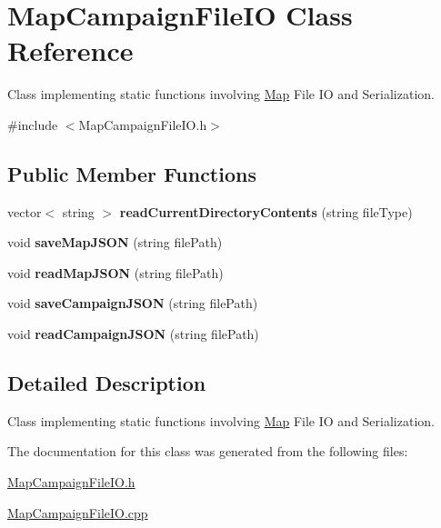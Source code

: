 \hypertarget{classMapCampaignFileIO}{}\section{Map\+Campaign\+File\+IO Class Reference}
\label{classMapCampaignFileIO}


Class implementing static functions involving \hyperlink{classMap}{Map} File IO and Serialization.  




{\ttfamily \#include $<$Map\+Campaign\+File\+I\+O.\+h$>$}

\subsection*{Public Member Functions}
\begin{DoxyCompactItemize}
\item 
\hypertarget{classMapCampaignFileIO_a9e2f40e478902cc4d3a8255d76fda173}{}\label{classMapCampaignFileIO_a9e2f40e478902cc4d3a8255d76fda173} 
vector$<$ string $>$ {\bfseries read\+Current\+Directory\+Contents} (string file\+Type)
\item 
\hypertarget{classMapCampaignFileIO_a60c4e254979763fbee357ab2f1f1dd32}{}\label{classMapCampaignFileIO_a60c4e254979763fbee357ab2f1f1dd32} 
void {\bfseries save\+Map\+J\+S\+ON} (string file\+Path)
\item 
\hypertarget{classMapCampaignFileIO_a751d721e01346c5f32cf556349e1cb8f}{}\label{classMapCampaignFileIO_a751d721e01346c5f32cf556349e1cb8f} 
void {\bfseries read\+Map\+J\+S\+ON} (string file\+Path)
\item 
\hypertarget{classMapCampaignFileIO_afb7275ed76dd0ce2d73f12bf12206460}{}\label{classMapCampaignFileIO_afb7275ed76dd0ce2d73f12bf12206460} 
void {\bfseries save\+Campaign\+J\+S\+ON} (string file\+Path)
\item 
\hypertarget{classMapCampaignFileIO_a0676c2315398387f5a626cd91a980d7e}{}\label{classMapCampaignFileIO_a0676c2315398387f5a626cd91a980d7e} 
void {\bfseries read\+Campaign\+J\+S\+ON} (string file\+Path)
\end{DoxyCompactItemize}


\subsection{Detailed Description}
Class implementing static functions involving \hyperlink{classMap}{Map} File IO and Serialization. 

The documentation for this class was generated from the following files\+:\begin{DoxyCompactItemize}
\item 
\hyperlink{MapCampaignFileIO_8h}{Map\+Campaign\+File\+I\+O.\+h}\item 
\hyperlink{MapCampaignFileIO_8cpp}{Map\+Campaign\+File\+I\+O.\+cpp}\end{DoxyCompactItemize}
